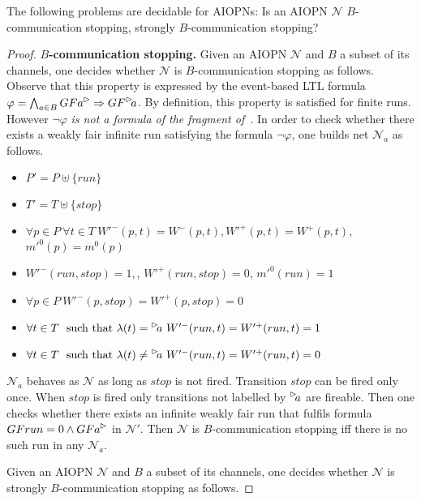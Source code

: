 \begin{theorem}
\label{thm:management-dec}
The following problems are decidable for AIOPNs: Is an AIOPN $\mathcal N$
$B$-communication stopping, strongly $B$-communication stopping? 
\end{theorem}
\begin{proof}
	{\bf $B$-communication stopping.}
Given an AIOPN $\mathcal N$ and $B$ a subset of its channels, one
decides whether $\mathcal N$ is $B$-communication stopping as follows.
Observe that this property is expressed by the event-based LTL
formula $\varphi=\bigwedge_{a \in B} GF \outact{a} \Rightarrow GF \inact{a}$. 
By definition, this property is satisfied for finite runs. 
However $\neg \varphi$ \emph{is not a formula of the fragment
of~\cite{Jancar90}}. In order to check whether there exists
a weakly fair infinite run satisfying the formula $\neg \varphi$,
one builds net $\mathcal N_a$ as follows.

\begin{itemize}
%
	\item $P'=P\uplus \{run\}$
%
	\item $T'=T\uplus \{stop\}$ 
%
	\item $\forall p \in P\ \forall t \in T\ W'^-(p,t)=W^-(p,t), W'^+(p,t)=W^+(p,t)$, $m'^0(p)=m^0(p)$
%
	\item $W'^-(run,stop)=1,$, $W'^+(run,stop)=0$, $m'^0(run)=1$
%
	\item $\forall p \in P\  W'^-(p,stop)=W'^+(p,stop)=0$
%
	\item $\forall t \in T\ \mbox{ such that }\lambda(t)=\inact{a}\ W'^-(run,t)=W'^+(run,t)=1$
%
	\item $\forall t \in T\ \mbox{ such that }\lambda(t)\neq\inact{a}\ W'^-(run,t)=W'^+(run,t)=0$
%
\end{itemize}

$\mathcal N_a$ behaves as $\mathcal N$ as long as $stop$ is not fired.
Transition $stop$ can be fired only once.
When $stop$ is fired only transitions not labelled by $\inact{a}$ are fireable.
Then one checks whether there exists an infinite weakly fair run 
that fulfils formula $GF run=0 \wedge  GF \outact{a} $ in
$\mathcal N'$. Then $\mathcal N$ is $B$-communication stopping 
iff there is no such run in any $\mathcal N_a$.

\smallskip{}
Given an AIOPN $\mathcal N$ and $B$ a subset of its channels, one
decides whether $\mathcal N$ is strongly $B$-communication stopping as follows.


\end{proof}
